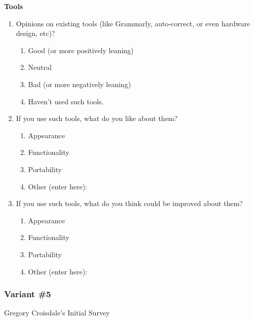 \documentclass[acmsmall,screen,authorversion,nonacm]{acmart}
\begin{document}
\textbf{Tools}
\begin{enumerate}
    \item Opinions on existing tools (like Grammarly, auto-correct, or even hardware design, etc)?
        \begin{enumerate}
            \item Good (or more positively leaning)
            \item Neutral
            \item Bad (or more negatively leaning)
            \item Haven’t used such tools.
        \end{enumerate}
    \item If you use such tools, what do you like about them?
        \begin{enumerate}
            \item Appearance
            \item Functionality
            \item Portability
            \item Other (enter here):
        \end{enumerate}
    \item If you use such tools, what do you think could be improved about them?
        \begin{enumerate}
            \item Appearance
            \item Functionality
            \item Portability
            \item Other (enter here):
        \end{enumerate}
\end{enumerate}

\subsubsection{Variant \#5}
\label{var5}
Gregory Croisdale's Initial Survey 
\end{document}
